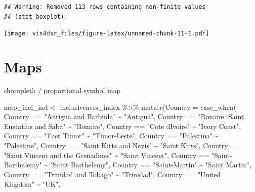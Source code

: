 \documentclass[
]{krantz}
\makeatletter
\newenvironment{Shaded}{\begin{snugshade}}{\end{snugshade}}
\newcommand{\AttributeTok}[1]{\textcolor[rgb]{0.61,0.61,0.61}{#1}}
\newcommand{\FunctionTok}[1]{\textcolor[rgb]{0,0,0}{#1}}
\newcommand{\NormalTok}[1]{#1}
\newcommand{\OtherTok}[1]{\textcolor[rgb]{0.37,0.37,0.37}{#1}}
\newcommand{\SpecialCharTok}[1]{\textcolor[rgb]{0,0,0}{#1}}
\newcommand{\StringTok}[1]{\textcolor[rgb]{0.5,0.5,0.5}{#1}}
\newenvironment{kframe}{%
\medskip{}
\setlength{\fboxsep}{.8em}
 \def\at@end@of@kframe{}%
 \ifinner\ifhmode%
  \def\at@end@of@kframe{\end{minipage}}%
  \begin{minipage}{\columnwidth}%
 \fi\fi%
 \def\FrameCommand##1{\hskip\@totalleftmargin \hskip-\fboxsep
 \colorbox{shadecolor}{##1}\hskip-\fboxsep
     \hskip-\linewidth \hskip-\@totalleftmargin \hskip\columnwidth}%
 \MakeFramed {\advance\hsize-\width
   \@totalleftmargin\z@ \linewidth\hsize
   \@setminipage}}%
 {\par\unskip\endMakeFramed%
 \at@end@of@kframe}
\renewenvironment{Shaded}{\begin{kframe}}{\end{kframe}}
\makeatother
\begin{document}
\begin{verbatim}
## Warning: Removed 113 rows containing non-finite values
## (stat_boxplot).
\end{verbatim}

\texttt{[image: vis4dsr\_files/figure-latex/unnamed-chunk-11-1.pdf]}

\hypertarget{maps}{%
\section{Maps}\label{maps}}

choropleth / proportional symbol map

\begin{Shaded}
\begin{Highlighting}[]
\NormalTok{map\_incl\_ind }\OtherTok{\textless{}{-}}\NormalTok{ inclusiveness\_index }\SpecialCharTok{\%\textgreater{}\%}
  \FunctionTok{mutate}\NormalTok{(}\AttributeTok{Country =} \FunctionTok{case\_when}\NormalTok{(}
\NormalTok{    Country }\SpecialCharTok{==} \StringTok{"Antigua and Barbuda"} \SpecialCharTok{\textasciitilde{}} \StringTok{"Antigua"}\NormalTok{,}
\NormalTok{    Country }\SpecialCharTok{==} \StringTok{"Bonaire, Saint Eustatius and Saba"} \SpecialCharTok{\textasciitilde{}} \StringTok{"Bonaire"}\NormalTok{,}
\NormalTok{    Country }\SpecialCharTok{==} \StringTok{"Cote d\textquotesingle{}Ivoire"} \SpecialCharTok{\textasciitilde{}} \StringTok{"Ivory Coast"}\NormalTok{,}
\NormalTok{    Country }\SpecialCharTok{==} \StringTok{"East Timor"} \SpecialCharTok{\textasciitilde{}} \StringTok{"Timor{-}Leste"}\NormalTok{,}
\NormalTok{    Country }\SpecialCharTok{==} \StringTok{"Palestina"} \SpecialCharTok{\textasciitilde{}} \StringTok{"Palestine"}\NormalTok{,}
\NormalTok{    Country }\SpecialCharTok{==} \StringTok{"Saint Kitts and Nevis"} \SpecialCharTok{\textasciitilde{}} \StringTok{"Saint Kitts"}\NormalTok{,}
\NormalTok{    Country }\SpecialCharTok{==} \StringTok{"Saint Vincent and the Grenadines"} \SpecialCharTok{\textasciitilde{}} \StringTok{"Saint Vincent"}\NormalTok{,}
\NormalTok{    Country }\SpecialCharTok{==} \StringTok{"Saint{-}Barthalemy"} \SpecialCharTok{\textasciitilde{}} \StringTok{"Saint Barthelemy"}\NormalTok{,}
\NormalTok{    Country }\SpecialCharTok{==} \StringTok{"Saint{-}Martin"} \SpecialCharTok{\textasciitilde{}} \StringTok{"Saint Martin"}\NormalTok{,}
\NormalTok{    Country }\SpecialCharTok{==} \StringTok{"Trinidad and Tobago"} \SpecialCharTok{\textasciitilde{}} \StringTok{"Trinidad"}\NormalTok{,}
\NormalTok{    Country }\SpecialCharTok{==} \StringTok{"United Kingdom"} \SpecialCharTok{\textasciitilde{}} \StringTok{"UK"}\NormalTok{,}

\end{Highlighting}
\end{Shaded}
\end{document}
